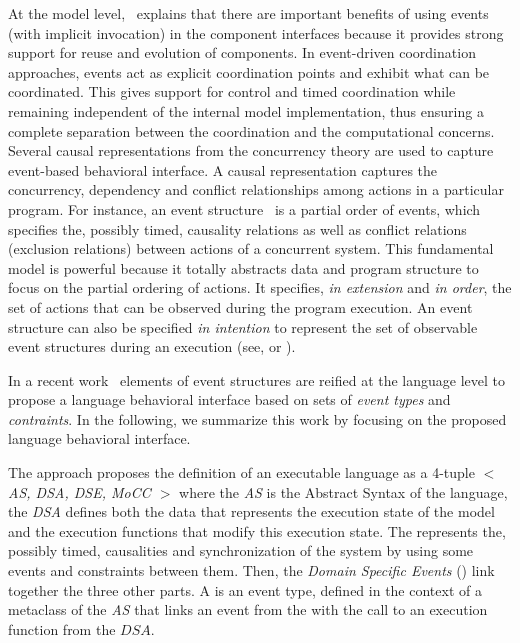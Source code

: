 At the model level,~\cite{garlansoftarchbib} explains that there are important benefits of using events (with implicit invocation) in the component interfaces because it provides strong support for reuse and evolution of components. In event-driven coordination approaches, events act as explicit coordination points and exhibit what can be coordinated. This gives support for control and timed coordination while remaining independent of the internal model implementation, thus ensuring a complete separation between the coordination and the computational concerns. Several causal representations from the concurrency theory are used to capture event-based behavioral interface. A causal representation captures the concurrency, dependency and conflict relationships among actions in a particular program. For instance, an event structure~\cite{eventStructures} is a partial order of events, which specifies the, possibly timed, causality relations as well as conflict relations (\ie exclusion relations) between actions of a concurrent system. This fundamental model is powerful because it totally abstracts data and program structure to focus on the partial ordering of actions. It specifies, \emph{in extension} and \emph{in order}, the set of actions that can be observed during the program execution. An event structure can also be specified \emph{in intention} to represent the set of observable event structures during an execution (see, \eg\cite{ccslbib} or \cite{tagmachinebib}).

In a recent work~\cite{sle13-combemale} elements of event structures are reified at the language level to propose a language behavioral interface based on sets of \emph{event types} and \emph{contraints}. In the following, we summarize this work by focusing on the proposed language behavioral interface. 

The approach proposes the definition of an executable language as a 4-tuple \emph{$<$ AS, DSA, DSE, MoCC $>$} where the \emph{AS} is the Abstract Syntax of the language, the \emph{DSA} defines both the data that represents the execution state of the model and the execution functions that modify this execution state. The \mocc represents the, possibly timed, causalities and synchronization of the system by using some events and constraints between them. Then, the \emph{Domain Specific Events} (\dse) link together the three other parts. A \dse is an event type, defined in the context of a metaclass of the \emph{AS} that links an event from the \mocc with the call to an execution function from the $DSA$. 

